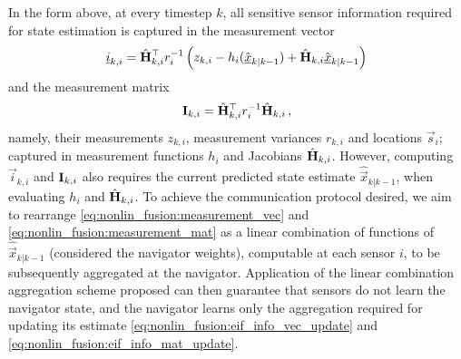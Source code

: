 In the form above, at every timestep $k$, all sensitive sensor information required for state estimation is captured in the measurement vector
\begin{equation}\label{eq:nonlin_fusion:measurement_vec}
    {\underline{i}}_{k,i} = \hat{{{\mathbf{H}}}}^\top_{k,i} r^{-1}_i \left(z_{k,i} - h_i(\hat{{\underline{x}}}_{k|k-1}) + \hat{{{\mathbf{H}}}}_{k,i}\hat{{\underline{x}}}_{k|k-1}\right)
\end{equation}
and the measurement matrix
\begin{equation}\label{eq:nonlin_fusion:measurement_mat}
    {\ensuremath{{\mathbf{I}}}}_{k,i} = \hat{{{\mathbf{H}}}}^\top_{k,i} r^{-1}_i \hat{{{\mathbf{H}}}}_{k,i}\,,
\end{equation}
namely, their measurements $z_{k,i}$, measurement variances $r_{k,i}$ and locations $\vec{s}_i$; captured in measurement functions $h_i$ and Jacobians $\hat{{{\mathbf{H}}}}_{k,i}$. However, computing $\vec{i}_{k,i}$ and ${{\mathbf{I}}}_{k,i}$ also requires the current predicted state estimate $\hat{\vec{x}}_{k|k-1}$, when evaluating $h_i$ and $\hat{{{\mathbf{H}}}}_{k,i}$. To achieve the communication protocol desired, we aim to rearrange \eqref{eq:nonlin_fusion:measurement_vec} and \eqref{eq:nonlin_fusion:measurement_mat} as a linear combination of functions of $\hat{\vec{x}}_{k|k-1}$ (considered the navigator weights), computable at each sensor $i$, to be subsequently aggregated at the navigator. Application of the linear combination aggregation scheme proposed can then guarantee that sensors do not learn the navigator state, and the navigator learns only the aggregation required for updating its estimate \eqref{eq:nonlin_fusion:eif_info_vec_update} and \eqref{eq:nonlin_fusion:eif_info_mat_update}.

% 
% 

